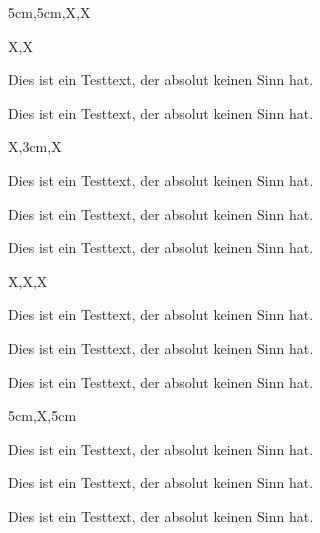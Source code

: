\documentclass[a3paper,13pt,scifiposter]{tubsposter}
\begin{document}
\layout[sender=top,bgcolor,scifiposter]{%
  \showtubslogo
}
\begin{scifiposter}{5cm,5cm,X,X}
  \begin{scifirow}{X,X}
    \begin{scificol}
      Dies ist ein Testtext, der absolut keinen Sinn hat.
    \end{scificol}
    \begin{scificol}
      Dies ist ein Testtext, der absolut keinen Sinn hat.
    \end{scificol}
  \end{scifirow}
  \begin{scifirow}{X,3cm,X}
    \begin{scificol}
      Dies ist ein Testtext, der absolut keinen Sinn hat.
    \end{scificol}
    \begin{scificol}
      Dies ist ein Testtext, der absolut keinen Sinn hat.
    \end{scificol}
    \begin{scificol}
      Dies ist ein Testtext, der absolut keinen Sinn hat.
    \end{scificol}
  \end{scifirow}
  \begin{scifirow}{X,X,X}
    \begin{scificol}
      Dies ist ein Testtext, der absolut keinen Sinn hat.
    \end{scificol}
    \begin{scificol}
      Dies ist ein Testtext, der absolut keinen Sinn hat.
    \end{scificol}
    \begin{scificol}
      Dies ist ein Testtext, der absolut keinen Sinn hat.
    \end{scificol}
  \end{scifirow}
  \begin{scifirow}{5cm,X,5cm}
    \begin{scificol}
      Dies ist ein Testtext, der absolut keinen Sinn hat.
    \end{scificol}
    \begin{scificol}
      Dies ist ein Testtext, der absolut keinen Sinn hat.
    \end{scificol}
    \begin{scificol}
      Dies ist ein Testtext, der absolut keinen Sinn hat.
    \end{scificol}
  \end{scifirow}
\end{scifiposter}
\end{document}
